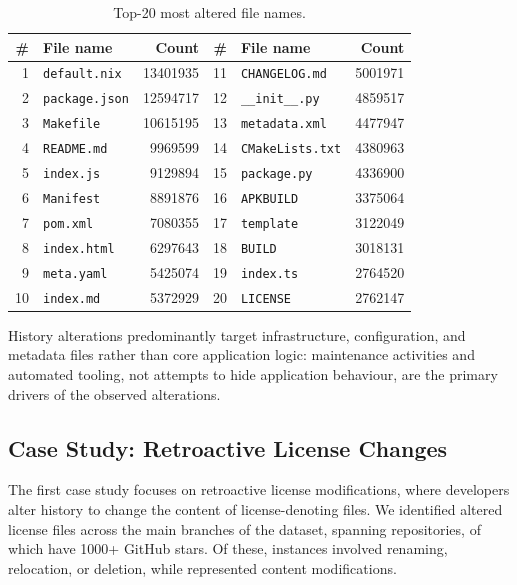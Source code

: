 \begin{table}[h]
\centering
\caption{Top-20 most altered file names.}
\label{tab:hist-top-filenames}
\small
\begin{tabular}{rlr@{\hskip 2em}rlr}
\hline
\textbf{\#} & \textbf{File name} & \textbf{Count} & \textbf{\#} & \textbf{File name} & \textbf{Count} \\
\hline
1 & \texttt{default.nix} & \num{13401935} & 11 & \texttt{CHANGELOG.md} & \num{5001971} \\
2 & \texttt{package.json} & \num{12594717} & 12 & \texttt{\_\_init\_\_.py} & \num{4859517} \\
3 & \texttt{Makefile} & \num{10615195} & 13 & \texttt{metadata.xml} & \num{4477947} \\
4 & \texttt{README.md} & \num{9969599} & 14 & \texttt{CMakeLists.txt} & \num{4380963} \\
5 & \texttt{index.js} & \num{9129894} & 15 & \texttt{package.py} & \num{4336900} \\
6 & \texttt{Manifest} & \num{8891876} & 16 & \texttt{APKBUILD} & \num{3375064} \\
7 & \texttt{pom.xml} & \num{7080355} & 17 & \texttt{template} & \num{3122049} \\
8 & \texttt{index.html} & \num{6297643} & 18 & \texttt{BUILD} & \num{3018131} \\
9 & \texttt{meta.yaml} & \num{5425074} & 19 & \texttt{index.ts} & \num{2764520} \\
10 & \texttt{index.md} & \num{5372929} & 20 & \texttt{LICENSE} & \num{2762147} \\
\hline
\end{tabular}
\end{table}

History alterations predominantly target infrastructure, configuration, and metadata files rather than core application logic: maintenance activities and automated tooling, not attempts to hide application behaviour, are the primary drivers of the observed alterations.
\subsection{Case Study: Retroactive License Changes}
\label{subsec:hist-sec-license}

The first case study focuses on retroactive license modifications, where developers alter history to change the content of license-denoting files.
We identified \LicenseAll altered license files across the main branches of the dataset, spanning \LicenseOrigins repositories, \LicenseOriginsThousandPlusStars of which have 1000+ GitHub stars.
Of these, \LicenseRemoved instances involved renaming, relocation, or deletion, while \LicenseModified represented content modifications.

